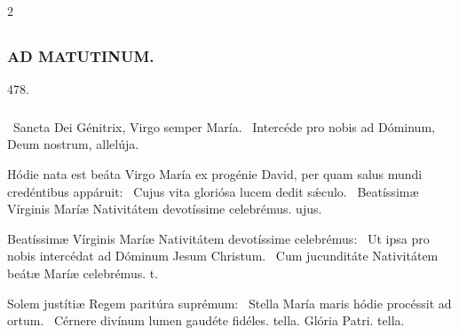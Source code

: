 \documentclass[9pt,twoside]{extarticle}
\begin{document}
\begin{multicols}{2}
\subsubsection*{\center \textsc{}}
\subsection*{\center \textsc{}}
\subsubsection*{\center \textsc{AD MATUTINUM.}}

\begin{tightlist}{}
\item {} 478.
\item {}
\item {}
\end{tightlist}
\subsubsection*{}
\begin{tightlist}{}
\item {}~Sancta Dei Génitrix, Virgo semper María. ~Intercéde pro nobis ad Dóminum, Deum nostrum, allelúja.
\item {} Hódie nata est beáta Virgo María ex progénie David, per quam salus mundi credéntibus appáruit: \textred{*}~Cujus vita gloriósa lucem dedit sǽculo. ~Beatíssimæ Vírginis Maríæ Nativitátem devotíssime celebrémus. ujus.
\item {} Beatíssimæ Vírginis Maríæ Nativitátem devotíssime celebrémus: \textred{*}~Ut ipsa pro nobis intercédat ad Dóminum Jesum Christum. ~Cum jucunditáte Nativitátem beátæ Maríæ celebrémus. t.
\item {} Solem justítiæ Regem paritúra suprémum: \textred{*}~Stella María maris hódie procéssit ad ortum. ~Cérnere divínum lumen gaudéte fidéles. tella. Glória Patri. tella.
\end{tightlist}

\end{multicols}
\end{document}
